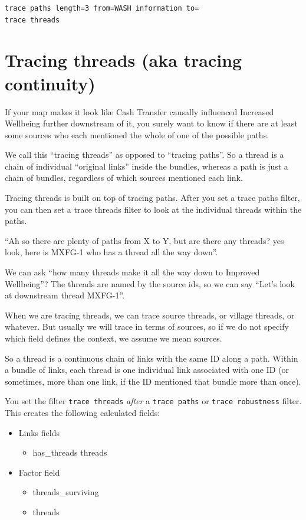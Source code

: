 \documentclass[
]{book}
\providecommand{\tightlist}{%
  \setlength{\itemsep}{0pt}\setlength{\parskip}{0pt}}
\begin{document}
\begin{verbatim}
trace paths length=3 from=WASH information to=
trace threads
\end{verbatim}

\hypertarget{xtracing-threads}{%
\section{Tracing threads (aka tracing continuity)}\label{xtracing-threads}}

If your map makes it look like Cash Transfer causally influenced Increased Wellbeing further downstream of it, you surely want to know if there are at least some sources who each mentioned the whole of one of the possible paths.

We call this ``tracing threads'' as opposed to ``tracing paths''. So a thread is a chain of individual ``original links'' inside the bundles, whereas a path is just a chain of bundles, regardless of which sources mentioned each link.

Tracing threads is built on top of tracing paths. After you set a trace paths filter, you can then set a trace threads filter to look at the individual threads within the paths.

``Ah so there are plenty of paths from X to Y, but are there any threads? yes look, here is MXFG-1 who has a thread all the way down''.

We can ask ``how many threads make it all the way down to Improved Wellbeing''? The threads are named by the source ids, so we can say ``Let's look at downstream thread MXFG-1''.

When we are tracing threads, we can trace source threads, or village threads, or whatever. But usually we will trace in terms of sources, so if we do not specify which field defines the context, we assume we mean sources.

So a thread is a continuous chain of links with the same ID along a path. Within a bundle of links, each thread is one individual link associated with one ID (or sometimes, more than one link, if the ID mentioned that bundle more than once).

You set the filter \texttt{trace\ threads} \emph{after} a \texttt{trace\ paths} or \texttt{trace\ robustness} filter. This creates the following calculated fields:

\begin{itemize}
\tightlist
\item
  Links fields

  \begin{itemize}
  \tightlist
  \item
    has\_threads threads
  \end{itemize}
\item
  Factor field

  \begin{itemize}
  \tightlist
  \item
    threads\_surviving
  \item
    threads
  \end{itemize}
\end{itemize}
\end{document}

